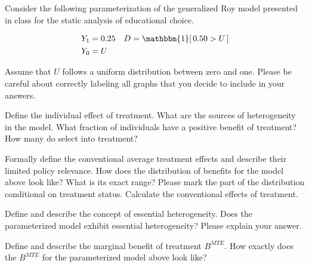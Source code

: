 Consider the following parameterization of the generalized Roy model presented in class for the static analysis of educational choice.

\begin{align*}
Y_1 & = 0.25     & D = \mathbbm{1}[\,0.50 > U\,] \\
Y_0 & = U &
\end{align*}

Assume that $U$ follows a uniform distribution between zero and one. Please be careful about correctly labeling all graphs that you decide to include in your answers.

\begin{boenumerate}

\item Define the individual effect of treatment. What are the sources of heterogeneity in the model. What fraction of individuals have a positive benefit of treatment?  How many do select into treatment?

\item Formally define the conventional average treatment effects and describe their limited policy relevance. How does the distribution of benefits for the model above look like? What is its exact range? Please mark the part of the distribution conditional on treatment status. Calculate the conventional effects of treatment.

\item Define and describe the concept of essential heterogeneity. Does the parameterized model exhibit essential heterogeneity? Please explain your answer.

\item Define and describe the marginal benefit of treatment $B^{MTE}$. How exactly does the $B^{MTE}$ for the parameterized model above look like?

\end{boenumerate}
